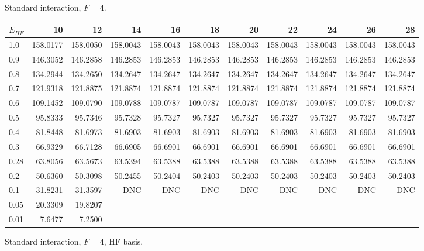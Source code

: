 \begin{landscape}
\begin{table}
\begin{center}
Standard interaction, $F=4$.\\
\begin{tabular}{l|rrrrrrrrrr}
\hline 
$E_{HF}$ & 10 & 12 & 14 & 16 & 18 & 20 & 22 & 24 & 26 & 28 \\
\hline \hline
1.0 & 158.0177 & 158.0050 & 158.0043 & 158.0043 & 158.0043 & 158.0043 & 158.0043 & 158.0043 & 158.0043 & 158.0043 \\ 
0.9 & 146.3052 & 146.2858 & 146.2853 & 146.2853 & 146.2853 & 146.2853 & 146.2853 & 146.2853 & 146.2853 & 146.2853 \\ 
0.8 & 134.2944 & 134.2650 & 134.2647 & 134.2647 & 134.2647 & 134.2647 & 134.2647 & 134.2647 & 134.2647 & 134.2647 \\ 
0.7 & 121.9318 & 121.8875 & 121.8874 & 121.8874 & 121.8874 & 121.8874 & 121.8874 & 121.8874 & 121.8874 & 121.8874 \\ 
0.6 & 109.1452 & 109.0790 & 109.0788 & 109.0787 & 109.0787 & 109.0787 & 109.0787 & 109.0787 & 109.0787 & 109.0787 \\ 
0.5 &  95.8333 &  95.7346 &  95.7328 &  95.7327 &  95.7327 &  95.7327 &  95.7327 &  95.7327 &  95.7327 &  95.7327 \\ 
0.4 &  81.8448 &  81.6973 &  81.6903 &  81.6903 &  81.6903 &  81.6903 &  81.6903 &  81.6903 &  81.6903 &  81.6903 \\ 
0.3 &  66.9329 &  66.7128 &  66.6905 &  66.6901 &  66.6901 &  66.6901 &  66.6901 &  66.6901 &  66.6901 &  66.6901 \\ 
0.28&  63.8056 &  63.5673 &  63.5394 &  63.5388 &  63.5388 &  63.5388 &  63.5388 &  63.5388 &  63.5388 &  63.5388 \\ 
0.2 &  50.6360 &  50.3098 &  50.2455 &  50.2404 &  50.2403 &  50.2403 &  50.2403 &  50.2403 &  50.2403 &  50.2403 \\ 
0.1 &  31.8231 &  31.3597 &      DNC &      DNC &      DNC &      DNC &  DNC     &   DNC    &      DNC &      DNC \\ 
0.05 & 20.3309 & 19.8207  \\ 
0.01 & 7.6477 & 7.2500  \\ 
\hline \hline
\end{tabular}
\end{center}
\begin{center}
Standard interaction, $F=4$, HF basis.\\
\begin{tabular}{l|rrrrrrrrrr}

\end{tabular}
\end{center}
\end{table}
\end{landscape}
